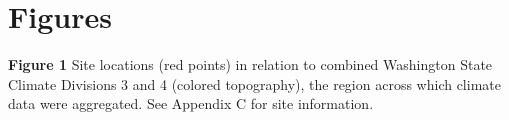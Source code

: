 \documentclass[notitlepage]{article}
\begin{document}
\section*{Figures}
\begin{center}
\textbf{Figure 1} Site locations (red points) in relation to combined Washington State Climate Divisions 3 and 4 (colored topography), the region across which climate data were aggregated. See Appendix C for site information.
\end{center}
\end{document}
